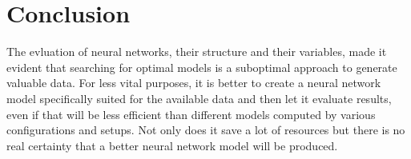 \chapter{Conclusion}
The evluation of neural networks, their structure and their variables, made it evident that searching for optimal models is a suboptimal approach to generate valuable data.
For less vital purposes, it is better to create a neural network model specifically suited for the available data and then let it evaluate results, even if that will be less efficient than different models computed by various configurations and setups. 
Not only does it save a lot of resources but there is no real certainty that a better neural network model will be produced.